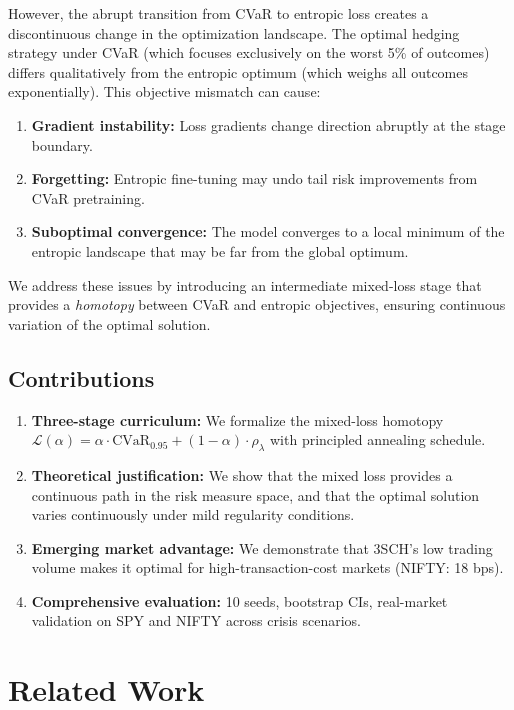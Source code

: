 \documentclass[11pt]{article}
\newcommand{\cvar}{\mathrm{CVaR}}
\begin{document}
However, the abrupt transition from CVaR to entropic loss creates a discontinuous change in the optimization landscape. The optimal hedging strategy under CVaR (which focuses exclusively on the worst 5\% of outcomes) differs qualitatively from the entropic optimum (which weighs all outcomes exponentially). This objective mismatch can cause:
\begin{enumerate}[noitemsep,leftmargin=*]
    \item \textbf{Gradient instability:} Loss gradients change direction abruptly at the stage boundary.
    \item \textbf{Forgetting:} Entropic fine-tuning may undo tail risk improvements from CVaR pretraining.
    \item \textbf{Suboptimal convergence:} The model converges to a local minimum of the entropic landscape that may be far from the global optimum.
\end{enumerate}

We address these issues by introducing an intermediate mixed-loss stage that provides a \emph{homotopy} between CVaR and entropic objectives, ensuring continuous variation of the optimal solution.

\subsection{Contributions}

\begin{enumerate}[noitemsep,leftmargin=*]
    \item \textbf{Three-stage curriculum:} We formalize the mixed-loss homotopy $\mathcal{L}(\alpha) = \alpha \cdot \cvar_{0.95} + (1-\alpha) \cdot \rho_\lambda$ with principled annealing schedule.
    \item \textbf{Theoretical justification:} We show that the mixed loss provides a continuous path in the risk measure space, and that the optimal solution varies continuously under mild regularity conditions.
    \item \textbf{Emerging market advantage:} We demonstrate that 3SCH's low trading volume makes it optimal for high-transaction-cost markets (NIFTY: 18 bps).
    \item \textbf{Comprehensive evaluation:} 10 seeds, bootstrap CIs, real-market validation on SPY and NIFTY across crisis scenarios.
\end{enumerate}

\section{Related Work}
\label{sec:related}
\end{document}
